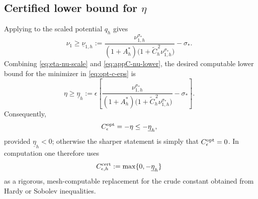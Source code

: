 \documentclass[11pt]{article}
\theoremstyle{plain}
\theoremstyle{definition}
\theoremstyle{remark}
\begin{document}
\subsection*{Certified lower bound for \texorpdfstring{$\eta$}{eta}}

Applying  to the scaled potential $q_h$ gives
\begin{equation}
\label{eq:appC-nu-lower}
  \nu_1
  \ge
  \underline\nu_{1,h}
  :=
  \frac{\nu_{1,h}^{\sigma_*}}
       {(1+A_h^*)\bigl(1+\widetilde C_h^{\,2}\nu_{1,h}^{\sigma_*}\bigr)}
  -\sigma_* .
\end{equation}
Combining \eqref{eq:eta-nu-scale} and \eqref{eq:appC-nu-lower}, the desired
computable lower bound for the minimizer in \eqref{eq:opt-c-eps} is
\begin{equation}
\label{eq:appC-eta-lower}
  \eta
  \ge
  \underline\eta_h
  :=
  \epsilon
  \left[
  \frac{\nu_{1,h}^{\sigma_*}}
       {(1+A_h^*)\bigl(1+\widetilde C_h^{\,2}\nu_{1,h}^{\sigma_*}\bigr)}
  -\sigma_*
  \right].
\end{equation}
Consequently,
\begin{equation}
\label{eq:appC-Ceps-upper}
  C_\epsilon^{\rm opt}
  =
  -\eta
  \le
  -\underline\eta_h,
\end{equation}
provided $\underline\eta_h<0$; otherwise the sharper statement is simply that
$C_\epsilon^{\rm opt}=0$.  In computation one therefore uses
\[
  C_{\epsilon,h}^{\rm cert}:=\max\{0,-\underline\eta_h\}
\]
as a rigorous, mesh-computable replacement for the crude constant obtained from
Hardy or Sobolev inequalities.




\end{document}
